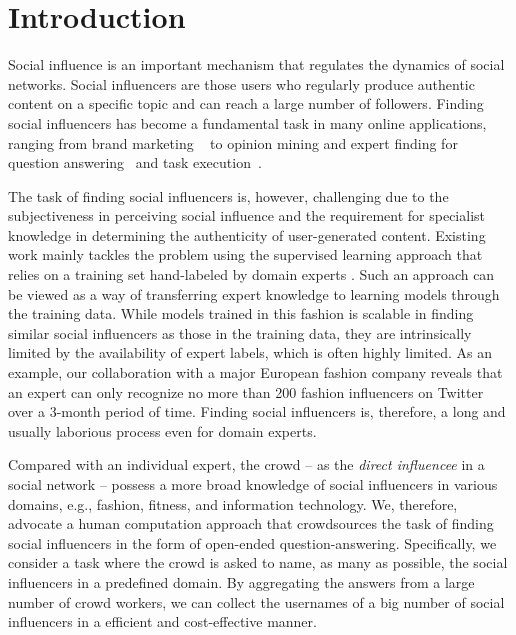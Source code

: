\section{Introduction}

Social influence is an important mechanism that regulates the dynamics of social networks. Social influencers are those users who regularly produce authentic content on a specific topic and can reach a large number of followers. Finding social influencers has become a fundamental task in many online applications, ranging from brand marketing
~\cite{bond201261,richardson2002mining,van2007new} to opinion mining \cite{pang2008opinion,li2012mining} and expert finding for question 
answering~\cite{riahi2012finding} and task execution~\cite{sun2014analyzing,miao2010generative}.  

The task of finding social influencers is, however, challenging due to the subjectiveness in perceiving social influence and the requirement for specialist knowledge in determining the authenticity of user-generated content. Existing work mainly tackles the problem using the supervised learning approach that relies on a training set hand-labeled by domain experts \cite{Cheng2014,Lehmann2013,wei2016learning}.  Such an approach can be viewed as a way of transferring expert knowledge to learning models through the training data. While models trained in this fashion is scalable in finding similar social influencers as those in the training data, they are intrinsically limited by the availability of expert labels, which is often highly limited. As an example, our collaboration with a major European fashion company reveals that an expert can only recognize no more than 200 fashion influencers on Twitter over a 3-month period of time. Finding social influencers is, therefore, a long and usually laborious process even for domain experts.

Compared with an individual expert, the crowd -- as the \emph{direct influencee} in a social network -- possess a more broad knowledge of social influencers in various domains, e.g., fashion, fitness, and information technology. We, therefore, advocate a human computation approach that crowdsources the task of finding social influencers in the form of open-ended question-answering. Specifically, we consider a task where the crowd is asked to name, as many as possible, the social influencers in a predefined domain. By aggregating the answers from a large number of crowd workers, we can collect the usernames of a big number of social influencers in a efficient and cost-effective manner. 

